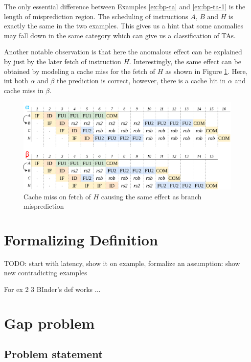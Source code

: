 The only essential difference between Examples \ref{ex:bp-ta} and \ref{ex:bp-ta-1} is the length of misprediction region. The scheduling of instructions $A$, $B$ and $H$ is exactly the same in the two examples. This gives us a hint that some anomalies may fall down in the same category which can give us a classification of TAs.

Another notable observation is that here the anomalous effect can be explained by just by the later fetch of instruction $H$. Interestingly, the same effect can be obtained by modeling a cache miss for the fetch of $H$ as shown in Figure \ref{fig:equiv-to-bp-ta}. Here, int both $\alpha$ and $\beta$ the prediction is correct, however, there is a cache hit in $\alpha$ and cache miss in $\beta$.

\begin{figure}[H]
    \centering
    \includegraphics[width=\textwidth]{figures/equiv-trace.png}
    \caption{Cache miss on fetch of $H$ causing the same effect as branch misprediction}
    \label{fig:equiv-to-bp-ta}
\end{figure}

\section{Formalizing Definition}

TODO: start with latency, show it on example, formalize an assumption: show new contradicting examples

For ex 2 3 BInder's def works ...

\section{Gap problem}

\subsection{Problem statement}

